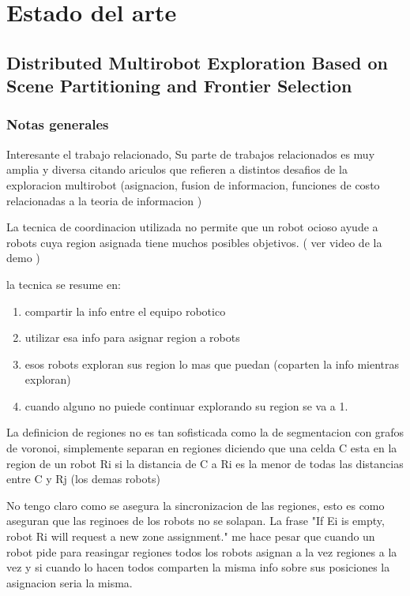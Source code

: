 \section{Estado del arte}

\subsection{Distributed Multirobot Exploration Based on Scene Partitioning and Frontier Selection}
\subsubsection{Notas generales}

Interesante el trabajo relacionado, Su parte de trabajos relacionados es muy amplia y diversa citando ariculos que refieren a distintos desafios de la exploracion multirobot (asignacion, fusion de informacion, funciones de costo relacionadas a la teoria de informacion )

La tecnica de coordinacion utilizada no permite que un robot ocioso ayude a robots cuya region asignada tiene muchos posibles objetivos. ( ver video de la demo )

la tecnica se resume en:
\begin{enumerate}
  \item compartir la info entre el equipo robotico
  \item utilizar esa info para asignar region a robots
  \item esos robots exploran sus region lo mas que puedan (coparten la info mientras exploran)
  \item cuando alguno no puiede continuar explorando su region se va a 1.
\end{enumerate}

La definicion de regiones no es tan sofisticada como la de segmentacion con grafos de voronoi, simplemente separan en regiones diciendo que una celda C esta en la region de un robot Ri si la distancia de C a Ri es la menor de todas las distancias entre C y Rj (los demas robots)

No tengo claro como se asegura la sincronizacion de las regiones, esto es como aseguran que las reginoes de los robots no se solapan. La frase "If Ei is empty, robot Ri will request a new zone assignment." me hace pesar que cuando un robot pide para reasingar regiones todos los robots asignan a la vez regiones a la vez y si cuando lo hacen todos comparten la misma info sobre sus posiciones la asignacion seria la misma.


